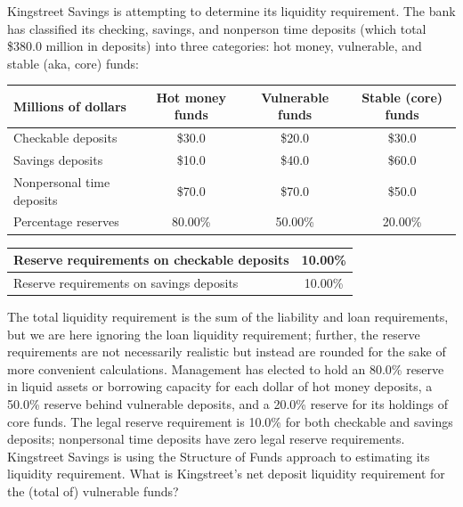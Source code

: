\documentclass{article}
\newcounter{question} %
\begin{document}
\begin{question}
    Kingstreet Savings is attempting to determine its liquidity requirement. The bank has classified its checking, savings, and nonperson time deposits (which total \$380.0 million in deposits) into three categories: hot money, vulnerable, and stable (aka, core) funds:

    \begin{table}[htbp]
        \centering
        \begin{tabular}{|l|c|c|c|}
            \hline
            \textbf{Millions of dollars} & \textbf{Hot money funds} & \textbf{Vulnerable funds} & \textbf{Stable (core) funds} \\
            \hline
            Checkable deposits         & \$30.0 & \$20.0 & \$30.0 \\
            Savings deposits           & \$10.0 & \$40.0 & \$60.0 \\
            Nonpersonal time deposits  & \$70.0 & \$70.0 & \$50.0 \\
            \hline
            Percentage reserves        & 80.00\% & 50.00\% & 20.00\% \\
            \hline
        \end{tabular}
    \end{table}

    \begin{table}[htbp]
        \centering
        \begin{tabular}{|l|c|}
            \hline
            Reserve requirements on checkable deposits & 10.00\% \\
            \hline
            Reserve requirements on savings deposits   & 10.00\% \\
            \hline
        \end{tabular}
    \end{table}

    The total liquidity requirement is the sum of the liability and loan requirements, but we are here ignoring the loan liquidity requirement; further, the reserve requirements are not necessarily realistic but instead are rounded for the sake of more convenient calculations. Management has elected to hold an 80.0\% reserve in liquid assets or borrowing capacity for each dollar of hot money deposits, a 50.0\% reserve behind vulnerable deposits, and a 20.0\% reserve for its holdings of core funds. The legal reserve requirement is 10.0\% for both checkable and savings deposits; nonpersonal time deposits have zero legal reserve requirements. Kingstreet Savings is using the Structure of Funds approach to estimating its liquidity requirement. What is Kingstreet's net deposit liquidity requirement for the (total of) vulnerable funds?
\end{question}
\end{document}
